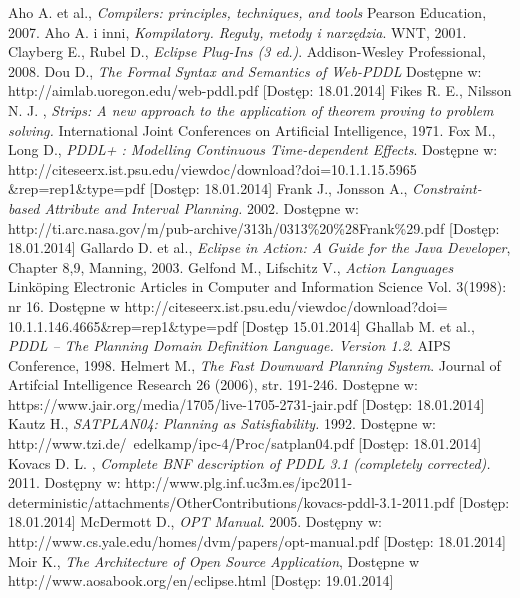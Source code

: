 
\begin{thebibliography}{1}

Aho A. et al., \emph{Compilers: principles,
techniques, and tools} Pearson Education, 2007.
 Aho A. i inni, \emph{Kompilatory. Reguły, metody i narzędzia}.
WNT, 2001.
 Clayberg E., Rubel D., \emph{Eclipse Plug-Ins (3 ed.)}. Addison-Wesley Professional, 2008. 
 Dou D., \emph{The Formal Syntax and Semantics of Web-PDDL} Dostępne w: http://aimlab.uoregon.edu/web-pddl.pdf [Dostęp: 18.01.2014]
 Fikes R. E., Nilsson N. J. , \emph{Strips: A new approach to the application of theorem proving to problem solving.} International Joint Conferences on Artificial Intelligence, 1971.
 Fox M., Long D., \emph{PDDL+ : Modelling Continuous Time-dependent Effects}. Dostępne w: http://citeseerx.ist.psu.edu/viewdoc/download?doi=10.1.1.15.5965 \&{}rep=rep1\&{}type=pdf [Dostęp: 18.01.2014]
 Frank J., Jonsson A., \emph{Constraint-based Attribute and Interval Planning.} 2002. Dostępne w:
http://ti.arc.nasa.gov/m/pub-archive/313h/0313\%20\%28Frank\%29.pdf [Dostęp: 18.01.2014] 
 Gallardo D. et al., \emph{Eclipse in Action: A Guide for the Java Developer}, Chapter 8,9, Manning, 2003.
 Gelfond M., Lifschitz V., \emph{Action Languages} Linköping Electronic Articles in
Computer and Information Science
Vol. 3(1998): nr 16. Dostępne w http://citeseerx.ist.psu.edu/viewdoc/download?doi= 10.1.1.146.4665\&{}rep=rep1\&{}type=pdf [Dostęp 15.01.2014]
 Ghallab M. et al., \emph{PDDL -- The Planning Domain Definition Language. Version 1.2}.
AIPS Conference, 1998.
 Helmert M., \emph{The Fast Downward Planning System}. Journal of Artifcial Intelligence Research 26 (2006), str. 191-246. Dostępne w: https://www.jair.org/media/1705/live-1705-2731-jair.pdf [Dostęp: 18.01.2014]
 Kautz H., \emph{SATPLAN04: Planning as Satisfiability.} 1992. Dostępne w:
http://www.tzi.de/~edelkamp/ipc-4/Proc/satplan04.pdf [Dostęp: 18.01.2014]
 Kovacs D. L. , \emph{Complete BNF description of PDDL 3.1 (completely corrected).} 2011. Dostępny w: http://www.plg.inf.uc3m.es/ipc2011-deterministic/attachments/OtherContributions/kovacs-pddl-3.1-2011.pdf [Dostęp: 18.01.2014]
 McDermott D., \emph{OPT Manual.} 2005. Dostępny w: http://www.cs.yale.edu/homes/dvm/papers/opt-manual.pdf [Dostęp: 18.01.2014]
 Moir K., \emph{The Architecture of Open Source Application}, Dostępne w http://www.aosabook.org/en/eclipse.html [Dostęp: 19.01.2014]

\end{thebibliography}
